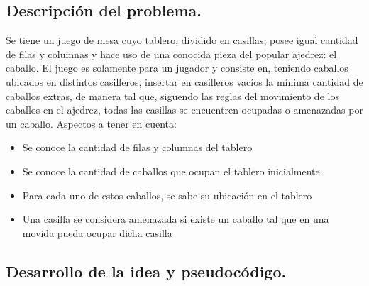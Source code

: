 \subsection{Descripción del problema.}

\vspace*{0.3cm}

Se tiene un juego de mesa cuyo tablero, dividido en casillas, posee igual cantidad de filas y columnas y hace uso de una conocida pieza del popular ajedrez: el caballo. El juego es solamente para un jugador y consiste en, teniendo caballos ubicados en distintos casilleros, insertar en casilleros vacíos la mínima cantidad de caballos extras, de manera tal que, siguendo las reglas del movimiento de los caballos en el ajedrez, todas las casillas se encuentren ocupadas o amenazadas por un caballo.
Aspectos a tener en cuenta:

\begin{itemize}
   \item Se conoce la cantidad de filas y columnas del tablero
   \item Se conoce la cantidad de caballos que ocupan el tablero inicialmente.
   \item Para cada uno de estos caballos, se sabe su ubicación en el tablero
   \item Una casilla se considera amenazada si existe un caballo tal que en una movida pueda ocupar dicha casilla
\end{itemize}


\vspace*{0.6cm}

\subsection{Desarrollo de la idea y pseudocódigo.}

\vspace*{0.3cm}



